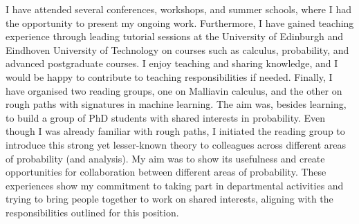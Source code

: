 \documentclass[12pt,a4paper]{moderncv}
\begin{document}




I have attended several conferences, workshops, and summer schools, where I had the opportunity to present my ongoing work. Furthermore,  I have gained teaching experience through leading tutorial sessions at the University of Edinburgh and Eindhoven University of Technology on courses such
as calculus, probability, and advanced postgraduate courses. I enjoy teaching and sharing knowledge, and I would be happy to contribute to teaching responsibilities if needed. Finally, I have organised two reading groups, one on Malliavin calculus, and the other on rough paths with signatures in machine learning. The aim was, besides learning, to build a group of PhD students with shared interests in probability. Even though I was already familiar with rough paths, I initiated the reading group to introduce this strong yet lesser-known theory to colleagues across different areas of probability (and analysis). My aim was to show its usefulness and create opportunities for collaboration between different areas of probability. These experiences show my commitment to taking part in departmental activities and trying to bring people together to work on shared interests, aligning with the responsibilities outlined for this position. 

\end{document}
